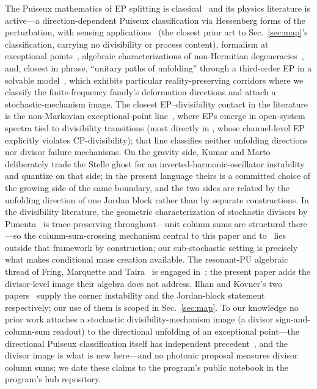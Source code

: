 ﻿\documentclass[11pt]{article}
\theoremstyle{remark}
\begin{document}
The Puiseux mathematics of EP splitting is classical~\cite{Kato}
and its physics literature is active---a direction-dependent
Puiseux classification via Hessenberg forms of the perturbation,
with sensing applications~\cite{Mandal2026} (the closest prior
art to Sec.~\ref{sec:map}'s classification, carrying no
divisibility or process content), formalism at exceptional
points~\cite{ChenJu2026}, algebraic characterizations of
non-Hermitian degeneracies~\cite{SayyadStarkov2026}, and, closest
in phrase, ``unitary paths of unfolding'' through a third-order EP
in a solvable model~\cite{BGZ2026}, which exhibits particular
reality-preserving corridors where we classify the
finite-frequency family's deformation directions and attach a
stochastic-mechanism image. The closest
EP--divisibility contact in the literature is the non-Markovian
exceptional-point line~\cite{QubitEP2025,NMEPtheory,WongZengLi2026},
where EPs
emerge in open-system spectra tied to divisibility transitions
(most directly in \cite{WongZengLi2026}, whose channel-level EP
explicitly violates CP-divisibility);
that line classifies neither unfolding directions nor divisor
failure mechanisms. On the gravity
side, Kumar and Marto~\cite{KumarMarto2026} deliberately trade the
Stelle ghost for an inverted-harmonic-oscillator instability and
quantize on that side; in the present language theirs is a
committed choice of the growing side of the same boundary, and the
two sides are related by the unfolding direction of one Jordan
block rather than by separate constructions. In the divisibility
literature, the geometric characterization of stochastic divisors
by Pimenta~\cite{Pimenta2025} is trace-preserving throughout---unit
column sums are structural there---so the column-sum-crossing
mechanism central to this paper and to~\cite{choosing} lies
outside that framework by construction; our sub-stochastic setting
is precisely what makes conditional mass creation available. The
resonant-PU algebraic thread of Fring, Marquette and
Taira~\cite{FMT2026} is engaged in~\cite{choosing}; the present
paper adds the divisor-level image their algebra does not address.
Ilhan and Kovner's two papers~\cite{IK2014,IK2013} supply the
corner instability and the Jordan-block statement respectively;
our use of them is scoped in Sec.~\ref{sec:map}. To our knowledge
no prior work attaches a stochastic divisibility-mechanism image
(a divisor sign-and-column-sum readout) to the directional
unfolding of an exceptional point---the directional Puiseux
classification itself has independent precedent~\cite{Mandal2026},
and the divisor image is what is new here---and no photonic
proposal measures
divisor column sums; we date these claims to the program's public
notebook in the program's hub repository.
\end{document}
